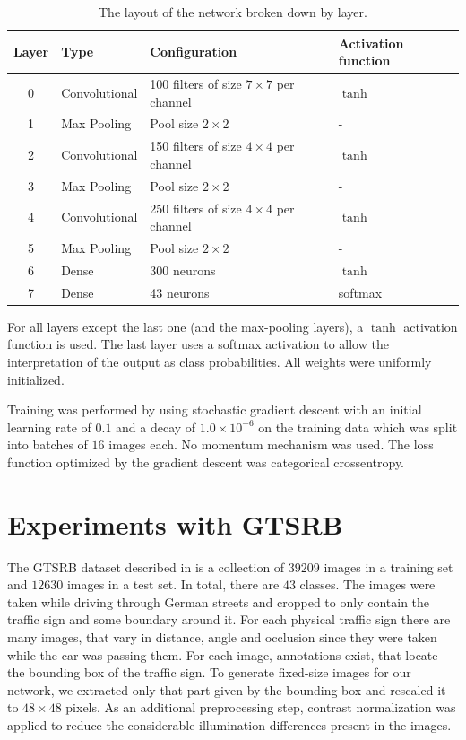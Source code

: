 \documentclass[11pt, a4paper]{article}
\begin{document}
\begin{table}[h!!!]
	\begin{tabular}{clll}
		Layer & Type & Configuration & Activation function \\
		\hline
		0 & Convolutional & 100 filters of size $7\times7$ per channel & $\tanh$ \\
		1 & Max Pooling & Pool size $2\times2$ & - \\
		2 & Convolutional & 150 filters of size $4\times4$ per channel & $\tanh$ \\
		3 & Max Pooling & Pool size $2\times2$ & - \\
		4 & Convolutional & 250 filters of size $4\times4$ per channel & $\tanh$ \\
		5 & Max Pooling & Pool size $2\times2$ & - \\
		6 & Dense & 300 neurons & $\tanh$ \\
		7 & Dense & 43 neurons & softmax
	\end{tabular}
	\caption{The layout of the network broken down by layer.}
	\label{tab:network-layout}
\end{table}

For all layers except the last one (and the max-pooling layers), a $\tanh$ activation function is used. The last layer uses a softmax activation to allow the interpretation of the output as class probabilities. All weights were uniformly initialized.

Training was performed by using stochastic gradient descent with an initial learning rate of $0.1$ and a decay of $1.0\times10^{-6}$ on the training data which was split into batches of $16$ images each. No momentum mechanism was used. The loss function optimized by the gradient descent was categorical crossentropy.

\section{Experiments with GTSRB}
The GTSRB dataset described in \cite{gtsrb} is a collection of $39209$ images in a training set and $12630$ images in a test set. In total, there are $43$ classes. The images were taken while driving through German streets and cropped to only contain the traffic sign and some boundary around it. For each physical traffic sign there are many images, that vary in distance, angle and occlusion since they were taken while the car was passing them. For each image, annotations exist, that locate the bounding box of the traffic sign. To generate fixed-size images for our network, we extracted only that part given by the bounding box and rescaled it to $48\times48$ pixels. As an additional preprocessing step, contrast normalization was applied to reduce the considerable illumination differences present in the images.
\end{document}
